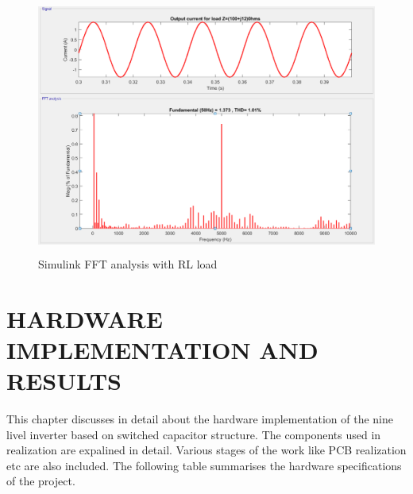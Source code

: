 \documentclass[12pt,a4paper]{report}
\begin{document}
\begin{figure}[H]
	\begin{center}
		\includegraphics[width=14cm,height=8.5cm]{figures/FFT_RL.png}
	\end{center}
	\caption{Simulink FFT analysis with RL load}
	\label{FFT2}
\end{figure}


\clearpage

\chapter{HARDWARE IMPLEMENTATION AND RESULTS}

This chapter discusses in detail about the hardware implementation of the nine livel inverter based on switched capacitor structure. The components used in realization are expalined in detail. Various stages of the work like PCB realization etc are also included. The following table summarises the hardware specifications of the project.\\
\end{document}
